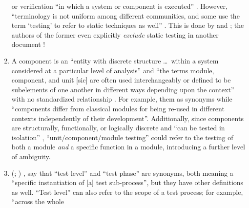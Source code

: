\begin{enumerate}
          \citep[p.~5\=/1]{SWEBOK2024} or verification ``in which a system or
          component is executed'' \citep[p.~427]{IEEE2017}. However,
          ``terminology is not uniform among different communities, and some
          use the term `testing' to refer to static techniques%
           as well'' \citep[p.~5\=/2]{SWEBOK2024}.
          This is done by \citet[pp.~16\==17]{IEEE2022} and
          \citet[pp.~8\==9]{Gerrard2000a}; the \ifnotpaper \else authors of the
          \fi former even explicitly \emph{exclude} static testing in another
          document \citeyearpar[p.~440]{IEEE2017}!
    \item %
          A component is an ``entity with discrete structure \dots\ within a
          system considered at a particular level of analysis''
          \citep{ISO_IEC2023b} and ``the terms module, component, and unit
              [sic] are often used interchangeably or defined to be subelements
          of one another in different ways depending upon the context'' with
          no standardized relationship \citep[p.~82]{IEEE2017}. For example,
          \citetISTQB{}  them as synonyms while
          \citet[p.~107]{BaresiAndPezzè2006}  ``components
          differ from classical modules for being re-used in different contexts
          independently of their development''.
          Additionally, since components are structurally, functionally, or
          logically discrete \citep[p.~419]{IEEE2017} and ``can be tested in
          isolation'' \citepISTQB{}, ``unit/component/module testing'' could
          refer to the testing of both a module \emph{and} a specific function
          in a module, introducing a further level of
          ambiguity.
    \item %
          \citeauthor{IEEE2017} \ifnotpaper
              (\citeyear[pp.~469, 470]{IEEE2017}; \citeyear[p.~9]{IEEE2013}) \else
              \cite[pp.~469, 470]{IEEE2017}, \cite[p.~9]{IEEE2013} \fi say that
          ``test level'' and ``test phase'' are synonyms, both meaning a
          ``specific instantiation of [a] test sub-process'', but they have
          other definitions as well. ``Test level'' can also
          refer to the scope of a test process; for example, ``across the whole

\end{enumerate}
